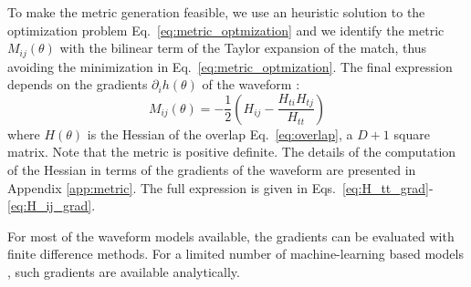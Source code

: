 \documentclass[twocolumn,showpacs,preprintnumbers,nofootinbib,prd,
superscriptaddress,10pt]{revtex4-2}
\begin{document}
To make the metric generation feasible, we use an heuristic solution to the optimization problem Eq.~\eqref{eq:metric_optmization} and we identify the metric $M_{ij}(\theta)$ with the bilinear term of the Taylor expansion of the match, thus avoiding the minimization in Eq.~\eqref{eq:metric_optmization}.
The final expression depends on the gradients $\partial_i h(\theta)$ of the waveform \cite{owen_metric}:
\begin{equation}\label{eq:metric_expression}
	M_{ij}(\theta) = - \frac{1}{2} \left( H_{ij} - \frac{H_{ti}H_{tj}}{H_{tt}} \right)
\end{equation}
where $H(\theta)$ is the Hessian of the overlap Eq.~\eqref{eq:overlap}, a $D+1$ square matrix.
Note that the metric is positive definite. The details of the computation of the Hessian in terms of the gradients of the waveform are presented in Appendix \ref{app:metric}. The full expression is given in Eqs.~\eqref{eq:H_tt_grad}-\eqref{eq:H_ij_grad}.

For most of the waveform models available, the gradients can be evaluated with finite difference methods. For a limited number of machine-learning based models \cite{Khan:2020fso, PhysRevD.103.043020, ML_wf_model, Tissino:2022thn}, such gradients are available analytically.

\end{document}
